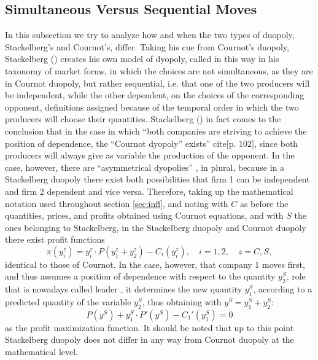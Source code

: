 \documentclass[12pt]{article}
\numberwithin{equation}{subsection}
\let\oldsubsection\subsection%
\renewcommand{\subsection}{%
  \renewcommand{\theequation}{\thesubsection.\arabic{equation}}%
  \oldsubsection}%
\begin{document}
\subsection{Simultaneous Versus Sequential Moves}
\label{sec:stack}
In this subsection we try to analyze how and when the two types of duopoly, Stackelberg's and Cournot's, differ. Taking his cue from Cournot's duopoly, Stackelberg (\citeyear{von_Stackelberg_2011}) creates his own model of dyopoly, called in this way in his taxonomy of market forms, in which the choices are not simultaneous, as they are in Cournot duopoly, but rather sequential, i.e. that one of the two producers will be independent, while the other dependent, on the choices of the corresponding opponent, definitions assigned because of the temporal order in which the two producers will choose their quantities. 
Stackelberg (\citeyear{von_Stackelberg_2011}) in fact comes to the conclusion that in the case in which ``both companies are striving to achieve the position of dependence, the ``Cournot dyopoly'' exists'' $\text{cite[p. 102]}$, since both producers will always give as variable the production of the opponent. In the case, however, there are ``asymmetrical dyopolies'' \cite[p. 102]{von_Stackelberg_2011}, in plural, because in a Stackelberg duopoly there exist both possibilities that firm 1 can be independent and firm 2 dependent and vice versa. Therefore, taking up the mathematical notation used throughout section \ref{sec:infl}, and noting with $C$ as before the quantities, prices, and profits obtained using Cournot equations, and with $S$ the ones belonging to Stackelberg, in the Stackelberg duopoly and Cournot duopoly there exist profit functions \begin{equation}
\label{eq:profit_s_c}
\pi (y^z_i) = y^z_i \cdot P(y^z_1 + y^z_2) - C_i(y^z_i), \quad i = 1,2, \quad z = C, S,
\end{equation}identical to those of Cournot. In the case, however, that company 1 moves first, and thus assumes a position of dependence with respect to the quantity $y^S_2$, role that is nowadays called leader \cite[p. 347]{Wiese_2021}, it determines the new quantity $y^S_1$, according to a predicted quantity of the variable $y^S_2$, thus obtaining with $y^S = y^S_1 + y^S_2$: \begin{equation}
\label{eq:p_max_s}
P(y^S) + y^S_1 \cdot P'(y^S) - C_1'(y^S_1) = 0
\end{equation} as the profit maximization function. It should be noted that up to this point Stackelberg duopoly does not differ in any way from Cournot duopoly at the mathematical level.
\end{document}
